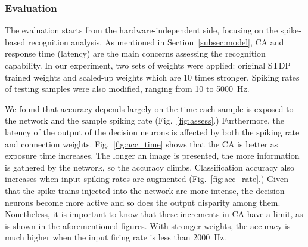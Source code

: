 \subsubsection{Evaluation}
The evaluation starts from the hardware-independent side, focusing on the spike-based recognition analysis.
As mentioned in Section~\ref{subsec:model}, CA and response time (latency) are the main concerns assessing the recognition capability.
In our experiment, two sets of weights were applied: original STDP trained weights and scaled-up weights which are 10 times stronger. Spiking rates of testing samples were also modified, ranging from 10 to 5000~Hz.

We found that accuracy depends largely on the time each sample is exposed to the network and the sample spiking rate (Fig.~\ref{fig:assess}.)
Furthermore, the latency of the output of the decision neurons is affected by both the spiking rate and connection weights.
Fig.~\ref{fig:acc_time} shows that the CA is better as exposure time increases. The longer an image is presented, the more information is gathered by the network, so the accuracy climbs.
Classification accuracy also increases when input spiking rates are augmented (Fig.~\ref{fig:acc_rate}.) Given that the spike trains injected into the network are more intense, the decision neurons become more active and so does the output disparity among them.
Nonetheless, it is important to know that these increments in CA have a limit, as is shown in the aforementioned figures.
With stronger weights, the accuracy is much higher when the input firing rate is less than 2000~Hz.


